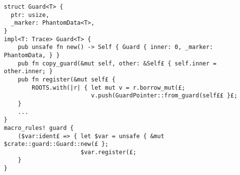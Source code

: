 \begin{lstlisting}[caption=Excerpt of \mc{Guard}s definitions,label=lst:guard-impl]
struct Guard<T> {
  ptr: usize,
  _marker: PhantomData<T>,
}
impl<T: Trace> Guard<T> {
    pub unsafe fn new() -> Self { Guard { inner: 0, _marker: PhantomData, } }
    pub fn copy_guard(&mut self, other: &Self£ { self.inner = other.inner; }
    pub fn register(&mut self£ {
        ROOTS.with(|r| { let mut v = r.borrow_mut(£;
                         v.push(GuardPointer::from_guard(self££ }£;
    }
    ...
}
macro_rules! guard {
    ($var:ident£ => { let $var = unsafe { &mut $crate::guard::Guard::new(£ };
                      $var.register(£;
    }
}\end{lstlisting}
